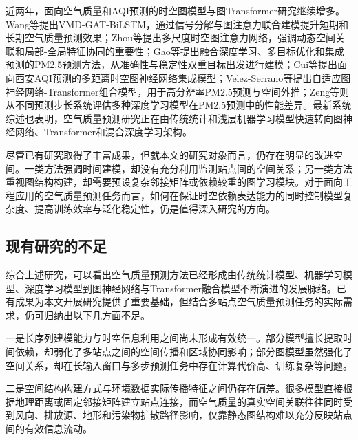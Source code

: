 近两年，面向空气质量和AQI预测的时空图模型与图Transformer研究继续增多。Wang等提出VMD-GAT-BiLSTM，通过信号分解与图注意力联合建模提升短期和长期空气质量预测效果\cite{wang_air_2024}；Zhou等提出多尺度时空图注意力网络，强调动态空间关联和局部-全局特征协同的重要性\cite{zhou_predicting_2024}；Gao等提出融合深度学习、多目标优化和集成预测的PM2.5预测方法，从准确性与稳定性双重目标出发进行建模\cite{gao_prediction_2024}；Cui等提出面向西安AQI预测的多距离时空图神经网络集成模型\cite{cui_air_2026}；Velez-Serrano等提出自适应图神经网络-Transformer组合模型，用于高分辨率PM2.5预测与空间外推\cite{velez-serrano_adaptive_2026}；Zeng等则从不同预测步长系统评估多种深度学习模型在PM2.5预测中的性能差异\cite{zeng_evaluating_2026}。最新系统综述也表明，空气质量预测研究正在由传统统计和浅层机器学习模型快速转向图神经网络、Transformer和混合深度学习架构\cite{agbehadji_systematic_2024,peinado_statistical_2025}。

尽管已有研究取得了丰富成果，但就本文的研究对象而言，仍存在明显的改进空间。一类方法强调时间建模，却没有充分利用监测站点间的空间关系；另一类方法重视图结构构建，却需要预设复杂邻接矩阵或依赖较重的图学习模块。对于面向工程应用的空气质量预测任务而言，如何在保证时空依赖表达能力的同时控制模型复杂度、提高训练效率与泛化稳定性，仍是值得深入研究的方向。

\subsection{现有研究的不足}

综合上述研究，可以看出空气质量预测方法已经形成由传统统计模型、机器学习模型、深度学习模型到图神经网络与Transformer融合模型不断演进的发展脉络。已有成果为本文开展研究提供了重要基础，但结合多站点空气质量预测任务的实际需求，仍可归纳出以下几方面不足。

一是长序列建模能力与时空信息利用之间尚未形成有效统一。部分模型擅长提取时间依赖，却弱化了多站点之间的空间传播和区域协同影响；部分图模型虽然强化了空间关系，却在长输入窗口与多步预测任务中存在计算代价高、训练复杂等问题\cite{zeng_are_2023,yu_spatio-temporal_2018,wu_graph_2019,guo_attention_2019,zheng_gman_2020,zhang_modeling_2023,zhang_temporal_2022,cai_improving_2023,al-qaness_resinformer_2023,wang_air_2024,zhou_predicting_2024,yu_mgsfformer_2025}。

二是空间结构构建方式与环境数据实际传播特征之间仍存在偏差。很多模型直接根据地理距离或固定邻接矩阵建立站点连接，而空气质量的真实空间关联往往同时受到风向、排放源、地形和污染物扩散路径影响，仅靠静态图结构难以充分反映站点间的有效信息流动\cite{baklanov_integrated_2007,zheng_forecasting_2015,abirami_regional_2021,wang_air_2024,zhou_predicting_2024}。

